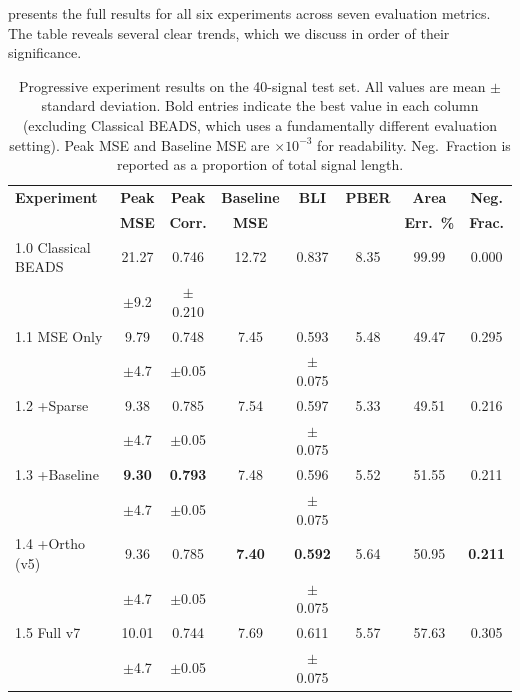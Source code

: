  presents the full results for all six experiments across seven evaluation metrics. The table reveals several clear trends, which we discuss in order of their significance.

\begin{table}[t]
    \centering
    \caption{Progressive experiment results on the 40-signal test set. All values are mean $\pm$ standard deviation. Bold entries indicate the best value in each column (excluding Classical BEADS, which uses a fundamentally different evaluation setting). Peak MSE and Baseline MSE are $\times 10^{-3}$ for readability. Neg.\ Fraction is reported as a proportion of total signal length.}
    \label{tab:progressive_results}
    \small
    \begin{tabular}{@{}lccccccc@{}}
        \toprule
        \textbf{Experiment} & \textbf{Peak} & \textbf{Peak} & \textbf{Baseline} & \textbf{BLI} & \textbf{PBER} & \textbf{Area} & \textbf{Neg.} \\
         & \textbf{MSE} & \textbf{Corr.} & \textbf{MSE} & & & \textbf{Err.\ \%} & \textbf{Frac.} \\
        \midrule
        1.0 Classical BEADS
            & 21.27 & 0.746 & 12.72 & 0.837 & 8.35 & 99.99 & 0.000 \\
            & {\scriptsize $\pm$9.2} & {\scriptsize $\pm$0.210} & & & & & \\
        \midrule
        1.1 MSE Only
            & 9.79 & 0.748 & 7.45 & 0.593 & 5.48 & 49.47 & 0.295 \\
            & {\scriptsize $\pm$4.7} & {\scriptsize $\pm$0.05} & & {\scriptsize $\pm$0.075} & & & \\
        1.2 +Sparse
            & 9.38 & 0.785 & 7.54 & 0.597 & 5.33 & 49.51 & 0.216 \\
            & {\scriptsize $\pm$4.7} & {\scriptsize $\pm$0.05} & & {\scriptsize $\pm$0.075} & & & \\
        1.3 +Baseline
            & \textbf{9.30} & \textbf{0.793} & 7.48 & 0.596 & 5.52 & 51.55 & 0.211 \\
            & {\scriptsize $\pm$4.7} & {\scriptsize $\pm$0.05} & & {\scriptsize $\pm$0.075} & & & \\
        1.4 +Ortho (v5)
            & 9.36 & 0.785 & \textbf{7.40} & \textbf{0.592} & 5.64 & 50.95 & \textbf{0.211} \\
            & {\scriptsize $\pm$4.7} & {\scriptsize $\pm$0.05} & & {\scriptsize $\pm$0.075} & & & \\
        1.5 Full v7
            & 10.01 & 0.744 & 7.69 & 0.611 & 5.57 & 57.63 & 0.305 \\
            & {\scriptsize $\pm$4.7} & {\scriptsize $\pm$0.05} & & {\scriptsize $\pm$0.075} & & & \\
        \bottomrule
    \end{tabular}
\end{table}


